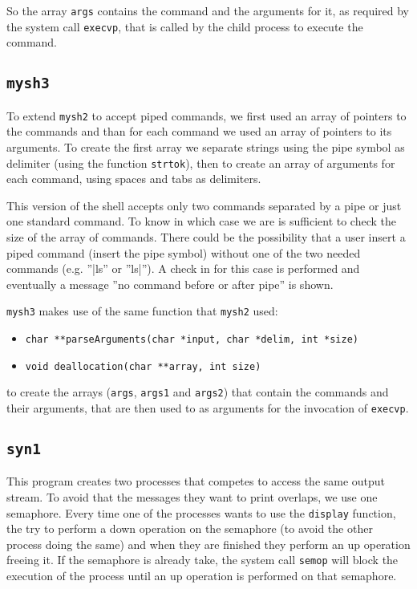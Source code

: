 So the array \texttt{args} contains the command and the arguments for it, as required by the system call \texttt{execvp}, that is called by the child process to execute the command.

\subsection{\texttt{mysh3}}
To extend \texttt{mysh2} to accept piped commands, we first used an array of pointers to the commands and than for each command we used an array of pointers to its arguments. To create the first array we separate strings using the pipe symbol as delimiter (using the function \texttt{strtok}), then to create an array of arguments for each command, using spaces and tabs as delimiters.  \newline

This version of the shell accepts only two commands separated by a pipe or just one standard command. To know in which case we are is sufficient to check the size of the array of commands. There could be the possibility that a user insert a piped command (insert the pipe symbol) without one of the two needed commands (e.g. ''|ls'' or ''ls|''). A check in for this case is performed and eventually a message ''no command before or after pipe'' is shown.\newline

\texttt{mysh3} makes use of the same function that \texttt{mysh2} used:
\begin{itemize}
\item{\texttt{char **parseArguments(char *input, char *delim, int *size)}}
\item{\texttt{void deallocation(char **array, int size)}}
\end{itemize}
to create the arrays (\texttt{args}, \texttt{args1} and \texttt{args2}) that contain the commands and their arguments, that are then used to as arguments for the invocation of \texttt{execvp}.



\subsection{\texttt{syn1}}
This program creates two processes that competes to access the same output stream. To avoid that the messages they want to print overlaps, we use one semaphore. Every time one of the processes wants to use the \texttt{display} function, the try to perform a down operation on the semaphore (to avoid the other process doing the same) and when they are finished they perform an up operation freeing it. If the semaphore is already take, the system call \texttt{semop} will block the execution of the process until an up operation is performed on that semaphore.
